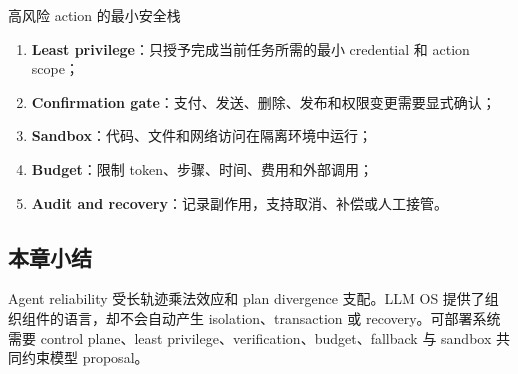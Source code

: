 \begin{importantbox}{高风险 action 的最小安全栈}
\begin{enumerate}
  \item \textbf{Least privilege}：只授予完成当前任务所需的最小 credential 和 action scope；
  \item \textbf{Confirmation gate}：支付、发送、删除、发布和权限变更需要显式确认；
  \item \textbf{Sandbox}：代码、文件和网络访问在隔离环境中运行；
  \item \textbf{Budget}：限制 token、步骤、时间、费用和外部调用；
  \item \textbf{Audit and recovery}：记录副作用，支持取消、补偿或人工接管。
\end{enumerate}
\end{importantbox}


\subsection{本章小结}

Agent reliability 受长轨迹乘法效应和 plan divergence 支配。LLM OS 提供了组织组件的语言，却不会自动产生 isolation、transaction 或 recovery。可部署系统需要 control plane、least privilege、verification、budget、fallback 与 sandbox 共同约束模型 proposal。

